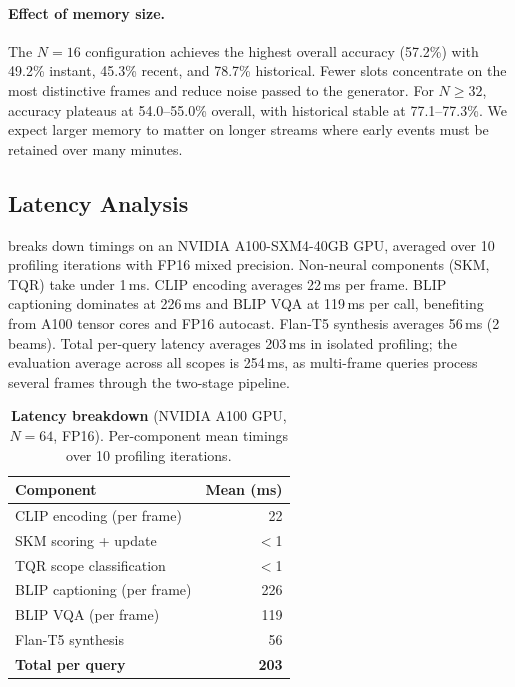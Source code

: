 \paragraph{Effect of memory size.}
The $N\!=\!16$ configuration achieves the highest overall accuracy (57.2\%) with 49.2\% instant, 45.3\% recent, and 78.7\% historical.
Fewer slots concentrate on the most distinctive frames and reduce noise passed to the generator.
For $N \ge 32$, accuracy plateaus at 54.0--55.0\% overall, with historical stable at 77.1--77.3\%.
We expect larger memory to matter on longer streams where early events must be retained over many minutes.


\subsection{Latency Analysis}
\label{sec:latency}

 breaks down timings on an NVIDIA A100-SXM4-40GB GPU, averaged over 10 profiling iterations with FP16 mixed precision.
Non-neural components (SKM, TQR) take under 1\,ms.
CLIP encoding averages 22\,ms per frame.
BLIP captioning dominates at 226\,ms and BLIP VQA at 119\,ms per call, benefiting from A100 tensor cores and FP16 autocast.
Flan-T5 synthesis averages 56\,ms (2 beams).
Total per-query latency averages 203\,ms in isolated profiling; the evaluation average across all scopes is 254\,ms, as multi-frame queries process several frames through the two-stage pipeline.

\begin{table}[t]
  \caption{\textbf{Latency breakdown} (NVIDIA A100 GPU, $N\!=\!64$, FP16). Per-component mean timings over 10 profiling iterations.}
  \label{tab:latency}
  \centering
  \small
  \begin{tabular}{@{}lr@{}}
    \toprule
    Component & Mean (ms) \\
    \midrule
    CLIP encoding (per frame)       & 22 \\
    SKM scoring + update            & $<$1 \\
    TQR scope classification        & $<$1 \\
    BLIP captioning (per frame)     & 226 \\
    BLIP VQA (per frame)            & 119 \\
    Flan-T5 synthesis               & 56 \\
    \midrule
    \textbf{Total per query}        & \textbf{203} \\
    \bottomrule
  \end{tabular}
\end{table}


